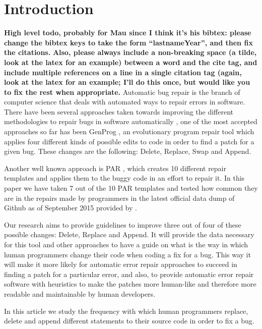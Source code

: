 \documentclass{sig-alternate-05-2015}
\newcommand{\todo}[1]
  {{\scriptsize \textbf{\color{red} {#1}}}}
\begin{document}


\section{Introduction}
\todo{High level todo, probably for Mau since I think it's his bibtex: please
  change the bibtex keys to take the form ``lastnameYear'', and then fix the
  citations.}
\todo{Also, please always include a non-breaking space (a tilde, look at the
  latex for an example) between a word and the cite tag, and include multiple
  references on a line in a single citation tag (again, look at the latex for an
  example; I'll do this once, but would like you to fix the rest when appropriate.}
Automatic bug repair is the branch of computer science that deals with automated
ways to repair errors in software. There have been several approaches taken
towards improving the different methodologies to repair bugs in software
automatically \cite{dongsun,weimer,claire,kai}, one of the
most accepted approaches so far has been GenProg \cite{weimer}\cite{claire}, an
evolutionary program repair tool which applies four different kinds of possible
edits to code in order to find a patch for a given bug. These changes are the
following: Delete, Replace, Swap and Append.

Another well known approach is PAR \cite{dongsun}, which creates 10 different
repair templates and applies them to the buggy code in an effort to repair
it. In this paper we have taken 7 out of the 10 PAR templates and tested how
common they are in the repairs made by programmers in the latest official data
dump of Github as of September 2015 provided by \cite{robert}.

Our research aims to provide guidelines to improve three out of four of these
possible changes: Delete, Replace and Append. It will provide the data necessary
for this tool and other approaches to have a guide on what is the way in which
human programmers change their code when coding a fix for a bug. This way it
will make it more likely for automatic error repair approaches to succeed in
finding a patch for a particular error, and also, to provide automatic error
repair software with heuristics to make the patches more human-like and
therefore more readable and maintainable by human developers.

In this article we study the frequency with which human programmers replace,
delete and append different statements to their source code in order to fix a
bug.
\end{document}
